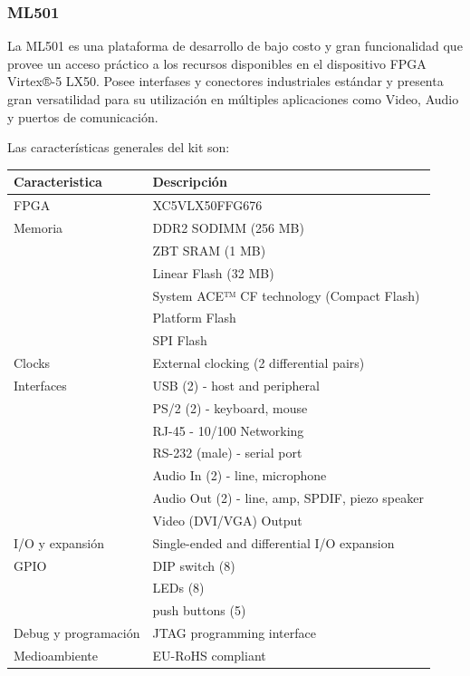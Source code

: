 				\subsubsection{ML501}
				La ML501 es una plataforma de desarrollo de bajo costo y gran funcionalidad que provee un acceso práctico a los recursos disponibles en el
				dispositivo FPGA Virtex®-5 LX50. Posee interfases y conectores industriales estándar y presenta gran versatilidad para su utilización en
				múltiples aplicaciones como Video, Audio y puertos de comunicación.
				
				Las características generales del kit son:
			
			\begin{tabular}{ p{4cm} p{10cm} }
			\rowcolor[gray]{0.8} Caracteristica & Descripción \\		
			\hline FPGA & XC5VLX50FFG676\\
			\hline Memoria & DDR2 SODIMM (256 MB)\\
			\hline 		   & ZBT SRAM (1 MB)\\
			\hline 		   & Linear Flash (32 MB)\\
			\hline         & System ACE™ CF technology (Compact Flash)\\
			\hline         & Platform Flash\\
			\hline         & SPI Flash\\
			\hline Clocks  & External clocking (2 differential pairs)\\
			\hline Interfaces & USB (2) - host and peripheral\\
			\hline 			  & PS/2 (2) - keyboard, mouse\\
			\hline 			  & RJ-45 - 10/100 Networking\\
			\hline 			  & RS-232 (male) - serial port\\
			\hline 			  & Audio In (2) - line, microphone\\
			\hline 			  & Audio Out (2) - line, amp, SPDIF, piezo speaker\\
			\hline 			  & Video (DVI/VGA) Output\\
			\hline I/O y expansión & Single-ended and differential I/O expansion\\
			\hline GPIO		&  DIP switch (8)\\
			\hline 			&  LEDs (8)\\
			\hline 			&  push buttons (5)\\
			\hline Debug y programación & JTAG programming interface\\
			\hline Medioambiente & EU-RoHS compliant \\
			\end{tabular}
				
